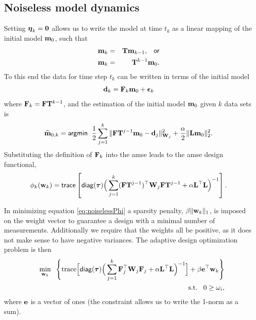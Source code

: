 \documentclass[11pt]{article}
\newcommand{\bfF}	{{\bf{F}}}
\newcommand{\bfL}	{{\bf{L}}}
\newcommand{\bfT}	{{\bf{T}}}
\newcommand{\bfW}	{{\bf{W}}}
\newcommand{\bfd}	{{\bf{d}}}
\newcommand{\bfe}	{{\bf{e}}}
\newcommand{\bfm}	{{\bf{m}}}
\newcommand{\bfw}	{{\bf{w}}}
\newcommand{\hf}        {{\frac 12}}
\newcommand{\bfepsilon} {{\boldsymbol \epsilon}}
\newcommand{\bfeta}     {{\boldsymbol \eta}}
\newcommand{\bftau}      {{\boldsymbol \tau}}
\newcommand{\LtL}       { \bfL^{\top}\bfL}
\newcommand {\zero}  { {\bf 0} }
\renewcommand{\hf}		 {\frac12}
\newcommand{\bfmhat}    {{\widehat{\bfm}}}
\begin{document}
\subsection{Noiseless model dynamics}
Setting $\bfeta_k = \zero$ allows us to write the model at time $t_k$ as a linear mapping of the initial model $\bfm_0$, such that
\begin{eqnarray*}
\bfm_{k} &=& \bfT\bfm_{k-1}, \;\;\;{\sf or } \\
\bfm_{k} &=& \bfT^{k-1}\bfm_0.
\end{eqnarray*} 
To this end the data for time step $t_k$ can be written in terms of the initial model 
\begin{equation}
\bfd_k = \bfF_k\bfm_0 + \bfepsilon_k
\end{equation}
where $\bfF_k = \bfF\bfT^{k-1}$, and the estimation of the initial model $\bfm_0$ given $k$ data sets is 
\begin{equation}
\bfmhat_{0,k} ={\sf argmin } \;\; \hf  \sum_{j=1}^{k}\| \bfF\bfT^{j-1}\bfm_0 - \bfd_j \|_{\bfW_j}^2 + \frac{\alpha}{2}\|\bfL\bfm_0\|_2^2.
\end{equation}
Substituting the definition of $\bfF_k$ into the {\sf amse} leads to the {\sf amse} design functional,
\begin{equation}
\label{eq:noiselessPhi}
\phi_{k}(\bfw_{k}) = {\sf trace} \left[  {\sf diag}(\bftau) \Big(\sum_{j=1}^{k}(\bfF\bfT^{j-1})^{\top}\bfW_{j}\bfF\bfT^{j-1}   +
\alpha \LtL \Big)^{-1} \right] .
\end{equation}

In minimizing equation \eqref{eq:noiselessPhi} a sparsity penalty, $\beta\|\bfw_k\|_1$, is imposed on the weight vector to guarantee a design with a minimal number of measurements. Additionally we require that the weights all be positive, as it does not make sense to have negative variances. The adaptive design optimization problem is then
\begin{eqnarray}
\label{eq:noiselessOpt}
\nonumber
 &&\min_{\bfw_k}\;\;\Bigg \{\text{trace}\Big[ {\sf diag}(\bftau) \Big(\sum_{j=1}^{k}\bfF_{j}^{\top}\bfW_{j}\bfF_{j}   +
\alpha \LtL\Big)^{-1}\Big] + \beta \bfe^{\top}\bfw_k \Bigg \}\\
 &&\text{ s.t.} \;\;\;0 \geq \omega_i,
\end{eqnarray}
where $\bfe$ is a vector of ones (the constraint allows us to write the 1-norm as a sum). 
\end{document}
